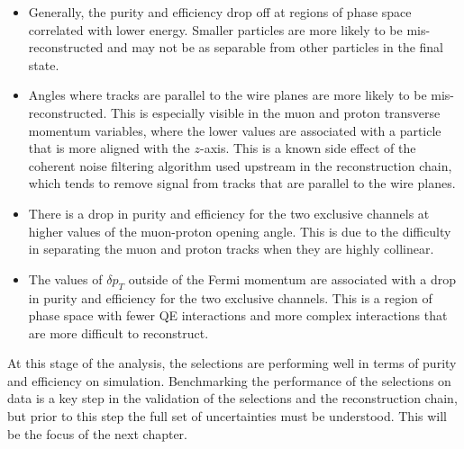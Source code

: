 \begin{itemize}
    \item Generally, the purity and efficiency drop off at regions of phase space correlated with lower energy. Smaller particles are more likely to be mis-reconstructed and may not be as separable from other particles in the final state. 
    \item Angles where tracks are parallel to the wire planes are more likely to be mis-reconstructed. This is especially visible in the muon and proton transverse momentum variables, where the lower values are associated with a particle that is more aligned with the $z$-axis. This is a known side effect of the coherent noise filtering algorithm used upstream in the reconstruction chain, which tends to remove signal from tracks that are parallel to the wire planes.
    \item There is a drop in purity and efficiency for the two exclusive channels at higher values of the muon-proton opening angle. This is due to the difficulty in separating the muon and proton tracks when they are highly collinear.
    \item The values of $\delta p_T$ outside of the Fermi momentum are associated with a drop in purity and efficiency for the two exclusive channels. This is a region of phase space with fewer QE interactions and more complex interactions that are more difficult to reconstruct.
\end{itemize}

At this stage of the analysis, the selections are performing well in terms of purity and efficiency on simulation. Benchmarking the performance of the selections on data is a key step in the validation of the selections and the reconstruction chain, but prior to this step the full set of uncertainties must be understood. This will be the focus of the next chapter.

